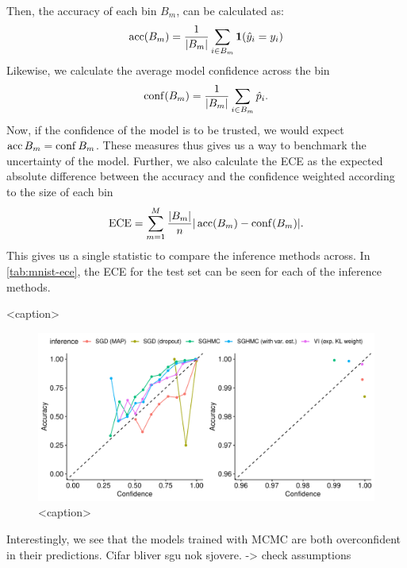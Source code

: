 Then, the accuracy of each bin $B_m$, can be calculated as:
\begin{align}
    \operatorname{acc}(B_m) = \frac{1}{|B_m|}\sum_{i\in B_m}\bm{1}(\hat{y}_i = y_i)
\end{align}
Likewise, we calculate the average model confidence across the bin
\begin{align}
    \operatorname{conf}(B_m) = \frac{1}{|B_m|}\sum_{i\in B_m} \hat{p}_i.
\end{align}
Now, if the confidence of the model is to be trusted, we would expect $\operatorname{acc}{B_m} = \operatorname{conf}{B_m}$.
These measures thus gives us a way to benchmark the uncertainty of the model.
Further, we also calculate the ECE as the expected absolute difference between the accuracy and the confidence weighted according to the size of each bin
\begin{align}
    \text{ECE} = \sum_{m=1}^{M} \frac{|B_m|}{n}|\operatorname{acc}(B_m)-\operatorname{conf}(B_m)|.
\end{align}
This gives us a single statistic to compare the inference methods across.
In \cref{tab:mnist-ece}, the ECE for the test set can be seen for each of the inference methods. 
\begin{table}[htbp]
    \centering
    
    \caption{<caption>}
    \label{tab:mnist-ece}
\end{table}
\begin{figure}[htbp]
    \centering
    \includegraphics[width=\linewidth]{Figures/mnist-calibration.pdf}
    \caption{<caption>}
    \label{<label>}
\end{figure}
Interestingly, we see that the models trained with MCMC are both overconfident in their predictions.  
Cifar bliver sgu nok sjovere. -> check assumptions
